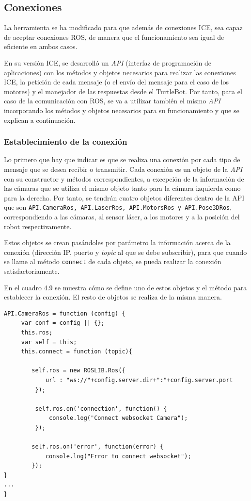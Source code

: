 \subsection{Conexiones}
La herramienta se ha modificado para que además de conexiones ICE, sea capaz de aceptar conexiones ROS, de manera que el funcionamiento sea igual de eficiente en ambos casos.

En su versión ICE, se desarrolló un \textit{API} (interfaz de programación de aplicaciones) con los métodos y objetos necesarios para realizar las conexiones ICE, la petición de cada mensaje (o el envío del mensaje para el caso de los motores) y el manejador de las respuestas desde el TurtleBot. Por tanto, para el caso de la comunicación con ROS, se va a utilizar también el mismo \textit{API} incorporando los métodos y objetos necesarios para su funcionamiento y que se explican a continuación.

\subsubsection{Establecimiento de la conexión}
Lo primero que hay que indicar es que se realiza una conexión por cada tipo de mensaje que se desea recibir o transmitir. Cada conexión es un objeto de la \textit{API} con su constructor y métodos correspondientes, a excepción de la información de las cámaras que se utiliza el mismo objeto tanto para la cámara izquierda como para la derecha. Por tanto, se tendrán cuatro objetos diferentes dentro de la API que son \texttt{API.CameraRos, API.LaserRos, API.MotorsRos y API.Pose3DRos}, correspondiendo a las cámaras, al sensor láser, a los motores y a la posición del robot respectivamente.

Estos objetos se crean pasándoles por parámetro la información acerca de la conexión (dirección IP, puerto y \textit{topic} al que se debe subscribir), para que cuando se llame al método \texttt{connect} de cada objeto, se pueda realizar la conexión satisfactoriamente.

En el cuadro 4.9 se muestra cómo se define uno de estos objetos y el método para establecer la conexión. El resto de objetos se realiza de la misma manera.


\begin{lstlisting}[caption= Establecimiento de la conexión ROS , label=cod.conexionTurtleBot]
API.CameraRos = function (config) {
	 var conf = config || {};
	 this.ros;
	 var self = this;
   	 this.connect = function (topic){
	
        self.ros = new ROSLIB.Ros({
            url : "ws://"+config.server.dir+":"+config.server.port
         });

         self.ros.on('connection', function() {
             console.log("Connect websocket Camera");
         });
         
        self.ros.on('error', function(error) {
            console.log("Error to connect websocket");
        });
}
...
}
\end{lstlisting}

